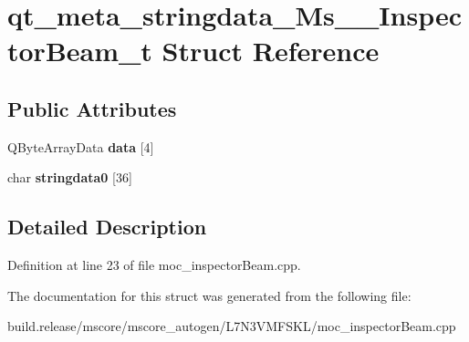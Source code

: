 \hypertarget{structqt__meta__stringdata___ms_____inspector_beam__t}{}\section{qt\+\_\+meta\+\_\+stringdata\+\_\+\+Ms\+\_\+\+\_\+\+Inspector\+Beam\+\_\+t Struct Reference}
\label{structqt__meta__stringdata___ms_____inspector_beam__t}
\subsection*{Public Attributes}
\begin{DoxyCompactItemize}
\item 
\mbox{\label{structqt__meta__stringdata___ms_____inspector_beam__t_ab6ad0499bfb3b52e33ece1de3919ceba}} 
Q\+Byte\+Array\+Data {\bfseries data} \mbox{[}4\mbox{]}
\item 
\mbox{\label{structqt__meta__stringdata___ms_____inspector_beam__t_a5cf13d4223b6c2ba4bfba779ef6189ec}} 
char {\bfseries stringdata0} \mbox{[}36\mbox{]}
\end{DoxyCompactItemize}


\subsection{Detailed Description}


Definition at line 23 of file moc\+\_\+inspector\+Beam.\+cpp.



The documentation for this struct was generated from the following file\+:\begin{DoxyCompactItemize}
\item 
build.\+release/mscore/mscore\+\_\+autogen/\+L7\+N3\+V\+M\+F\+S\+K\+L/moc\+\_\+inspector\+Beam.\+cpp\end{DoxyCompactItemize}
